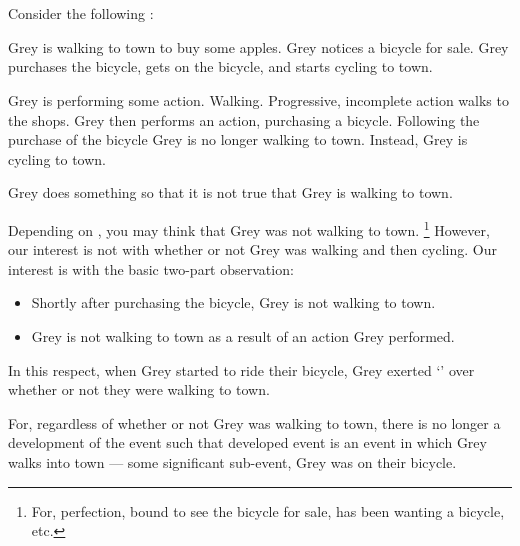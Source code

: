 \section{}
\label{cha:requs:infl}

\begin{note}
  Consider the following :

  \begin{scenario}[Apples]
    \label{scen:apples}
    Grey is walking to town to buy some apples.
    Grey notices a bicycle for sale.
    Grey purchases the bicycle, gets on the bicycle, and starts cycling to town.
  \end{scenario}

  Grey is performing some action.
  Walking.
  Progressive, incomplete action walks to the shops.
  Grey then performs an action, purchasing a bicycle.
  Following the purchase of the bicycle Grey is no longer walking to town.
  Instead, Grey is cycling to town.

  Grey does something so that it is not true that Grey is walking to town.

  Depending on , you may think that Grey was not walking to town.%
  \footnote{
    For, perfection, bound to see the bicycle for sale, has been wanting a bicycle, etc.
  }
  However, our interest is not with whether or not Grey was walking and then cycling.
  Our interest is with the basic two-part observation:
  \begin{itemize}[noitemsep]
  \item
    Shortly after purchasing the bicycle, Grey is not walking to town.
  \item
    Grey is not walking to town as a result of an action Grey performed.
  \end{itemize}

  In this respect, when Grey started to ride their bicycle, Grey exerted `\ninf{}' over whether or not they were walking to town.

  For, regardless of whether or not Grey was walking to town, there is no longer a development of the event such that developed event is an event in which Grey walks into town --- some significant sub-event, Grey was on their bicycle.
\end{note}


